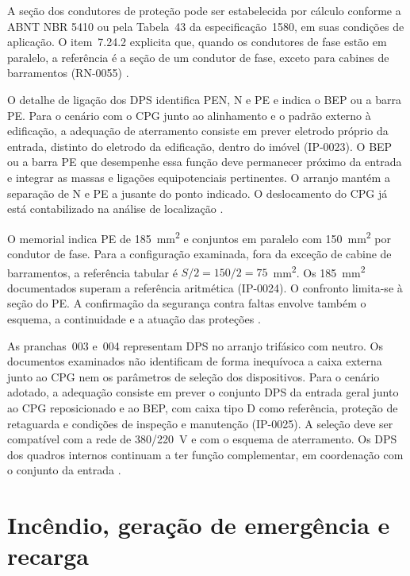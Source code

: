 A seção dos condutores de proteção pode ser estabelecida por cálculo conforme a ABNT NBR 5410 ou pela Tabela~43 da especificação~1580, em suas condições de aplicação. O item~7.24.2 explicita que, quando os condutores de fase estão em paralelo, a referência é a seção de um condutor de fase, exceto para cabines de barramentos (RN-0055) \cite[item~7.9.4]{enel0126}\cite[item~7.24.2 e tabela~43]{enel1580}.

O detalhe de ligação dos DPS identifica PEN, N e PE e indica o BEP ou a barra PE. Para o cenário com o CPG junto ao alinhamento e o padrão externo à edificação, a adequação de aterramento consiste em prever eletrodo próprio da entrada, distinto do eletrodo da edificação, dentro do imóvel (IP-0023). O BEP ou a barra PE que desempenhe essa função deve permanecer próximo da entrada e integrar as massas e ligações equipotenciais pertinentes. O arranjo mantém a separação de N e PE a jusante do ponto indicado. O deslocamento do CPG já está contabilizado na análise de localização \cite[pranchas~003 e~004]{palatiumpranchas2025}\cite[itens~7.24--7.24.3]{enel1580}.

O memorial indica PE de 185~mm\textsuperscript{2} e conjuntos em paralelo com 150~mm\textsuperscript{2} por condutor de fase. Para a configuração examinada, fora da exceção de cabine de barramentos, a referência tabular é \(S/2=150/2=75\)~mm\textsuperscript{2}. Os 185~mm\textsuperscript{2} documentados superam a referência aritmética (IP-0024). O confronto limita-se à seção do PE. A confirmação da segurança contra faltas envolve também o esquema, a continuidade e a atuação das proteções \cite[p.~1 e~7]{palatiummemorial2025}\cite[item~7.24.2 e tabela~43]{enel1580}.

As pranchas~003 e~004 representam DPS no arranjo trifásico com neutro. Os documentos examinados não identificam de forma inequívoca a caixa externa junto ao CPG nem os parâmetros de seleção dos dispositivos. Para o cenário adotado, a adequação consiste em prever o conjunto DPS da entrada geral junto ao CPG reposicionado e ao BEP, com caixa tipo D como referência, proteção de retaguarda e condições de inspeção e manutenção (IP-0025). A seleção deve ser compatível com a rede de 380/220~V e com o esquema de aterramento. Os DPS dos quadros internos continuam a ter função complementar, em coordenação com o conjunto da entrada \cite[pranchas~003 e~004]{palatiumpranchas2025}\cite[seção~7.25.4 e Desenho~19]{enel1580}.

\section{Incêndio, geração de emergência e recarga}

